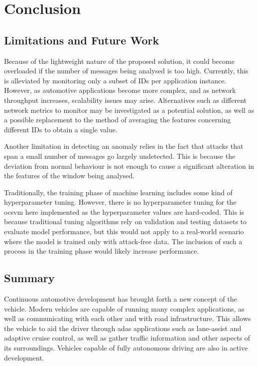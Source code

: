 \chapter{Conclusion}
\label{c:conclusion}

\section{Limitations and Future Work}

Because of the lightweight nature of the proposed solution, it could become overloaded if the number of messages being analysed is too high. Currently, this is alleviated by monitoring only a subset of IDs per application instance. However, as automotive applications become more complex, and as network throughput increases, scalability issues may arise. Alternatives such as different network metrics to monitor may be investigated as a potential solution, as well as a possible replacement to the method of averaging the features concerning different IDs to obtain a single value.\par

Another limitation in detecting an anomaly relies in the fact that attacks that span a small number of messages go largely undetected. This is because the deviation from normal behaviour is not enough to cause a significant alteration in the features of the window being analysed.\par

Traditionally, the training phase of machine learning includes some kind of hyperparameter tuning. However, there is no hyperparameter tuning for the \gls{ocsvm} here implemented as the hyperparameter values are hard-coded. This is because traditional tuning algorithms rely on validation and testing datasets to evaluate model performance, but this would not apply to a real-world scenario where the model is trained only with attack-free data. The inclusion of such a process in the training phase would likely increase performance.

\section{Summary}

Continuous automotive development has brought forth a new concept of the vehicle. Modern vehicles are capable of running many complex applications, as well as communicating with each other and with road infrastructure. This allows the vehicle to aid the driver through \gls{adas} applications such as lane-assist and adaptive cruise control, as well as gather traffic information and other aspects of its surroundings. Vehicles capable of fully autonomous driving are also in active development.\par

